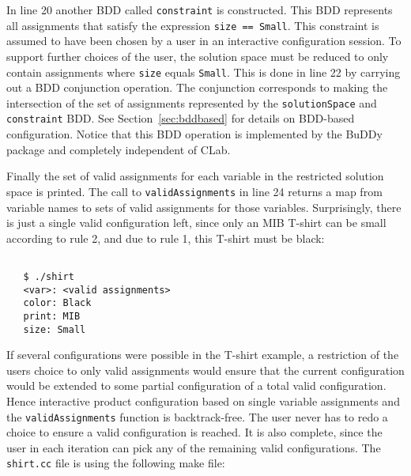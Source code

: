 \documentclass{article}
\begin{document}
In line 20 another BDD called \texttt{constraint} is constructed. This
BDD represents all assignments that satisfy the expression
\texttt{size == Small}. This constraint is assumed to have been chosen 
by a user in an interactive configuration session. To support further choices
of the user, the solution space must be reduced to only contain assignments
where \texttt{size} equals \texttt{Small}. This is done in line 22 by
carrying out a BDD conjunction operation. The conjunction corresponds to making
the intersection of the set of assignments represented by the
\texttt{solutionSpace} and \texttt{constraint} BDD. See
Section~\ref{sec:bddbased} for details on BDD-based
configuration. Notice that this BDD operation is implemented by the
BuDDy package and completely independent of CLab.

Finally the set of valid assignments for each variable in the
restricted solution space is printed. The call to
\texttt{validAssignments} in line 24 returns a map from variable names
to sets of valid assignments for those variables. Surprisingly, there
is just a single valid configuration left, since only an MIB T-shirt
can be small according to rule 2, and due to rule 1, this T-shirt must
be black:
\begin{verbatim}

   $ ./shirt
   <var>: <valid assignments>
   color: Black
   print: MIB
   size: Small

\end{verbatim} %
If several configurations were possible in the T-shirt example, a
restriction of the users choice to only valid assignments would ensure
that the current configuration would be extended to some partial
configuration of a total valid configuration. Hence interactive
product configuration based on single variable assignments and the
\texttt{validAssignments} function is backtrack-free. The user never has to
redo a choice to ensure a valid configuration is reached. It is also
complete, since the user in each iteration can pick any of the
remaining valid configurations. The \texttt{shirt.cc} file is using
the following make file:
\footnotesize
\end{document}
